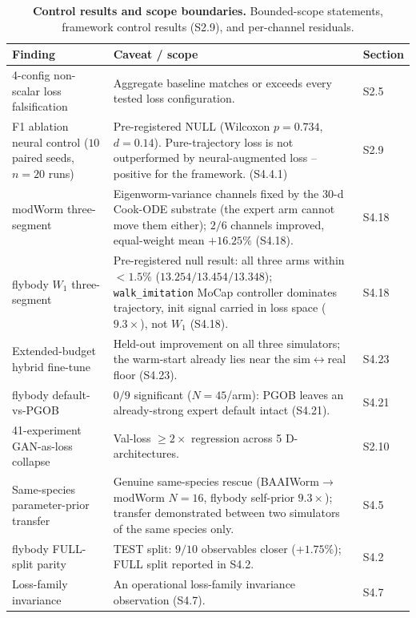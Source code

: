 \documentclass[11pt]{article}
\begin{document}
\begin{table}[H]\centering\footnotesize
\caption{\textbf{Control results and scope boundaries.} Bounded-scope statements, framework control results (S2.9), and per-channel residuals.}
\label{tab:ledger}
\begin{tabular}{p{} p{} p{}}\toprule
Finding & Caveat / scope & Section \\\midrule
4-config non-scalar loss falsification & Aggregate baseline matches or exceeds every tested loss configuration. & S2.5 \\
F1 ablation neural control ($10$ paired seeds, $n{=}20$ runs) & Pre-registered NULL (Wilcoxon $p{=}0.734$, $d{=}0.14$). Pure-trajectory loss is not outperformed by neural-augmented loss -- positive for the framework. (S4.4.1) & S2.9 \\
modWorm three-segment & Eigenworm-variance channels fixed by the 30-d Cook-ODE substrate (the expert arm cannot move them either); $2/6$ channels improved, equal-weight mean $+16.25\%$ (S4.18). & S4.18 \\
flybody $W_1$ three-segment & Pre-registered null result: all three arms within $<1.5\%$ ($13.254/13.454/13.348$); \texttt{walk\_imitation} MoCap controller dominates trajectory, init signal carried in loss space ($9.3\times$), not $W_1$ (S4.18). & S4.18 \\
Extended-budget hybrid fine-tune & Held-out improvement on all three simulators; the warm-start already lies near the sim$\leftrightarrow$real floor (S4.23). & S4.23 \\
flybody default-vs-PGOB & $0/9$ significant ($N{=}45$/arm): PGOB leaves an already-strong expert default intact (S4.21). & S4.21 \\
41-experiment GAN-as-loss collapse & Val-loss $\geq 2\times$ regression across 5 D-architectures. & S2.10 \\
Same-species parameter-prior transfer & Genuine same-species rescue (BAAIWorm$\to$modWorm $N{=}16$, flybody self-prior $9.3\times$); transfer demonstrated between two simulators of the same species only. & S4.5 \\
flybody FULL-split parity & TEST split: $9/10$ observables closer ($+1.75\%$); FULL split reported in S4.2. & S4.2 \\
Loss-family invariance & An operational loss-family invariance observation (S4.7). & S4.7 \\
\bottomrule
\end{tabular}
\end{table}
\end{document}
